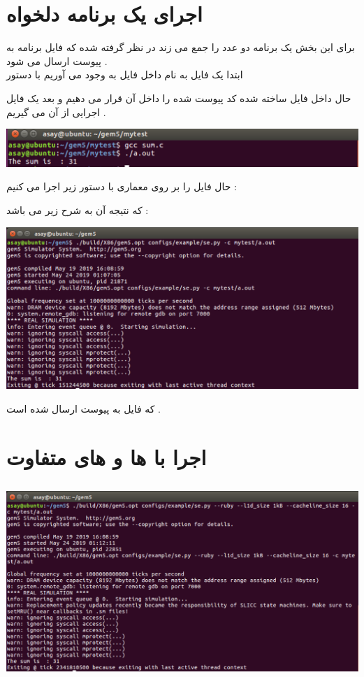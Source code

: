 \documentclass{article}
\begin{document}
\section*{اجرای یک برنامه دلخواه }
برای این بخش یک برنامه دو عدد را جمع می زند در نظر گرفته شده که فایل برنامه به پیوست ارسال می شود  . \\
ابتدا یک فایل به نام 
\textcolor{red}{}
داخل فایل 
به وجود می آوریم با دستور 
\begin{center}
\end{center}
حال داخل فایل ساخته شده کد پیوست شده را داخل آن قرار می دهیم و بعد یک فایل اجرایی از آن می گیریم . 
\begin{center}
	\includegraphics[width=1\textwidth]{sumbuild}
\end{center}
حال فایل 
را بر روی معماری 
با دستور زیر اجرا می کنیم  : 
\begin{center}
\end{center}
که نتیجه آن به شرح زیر می باشد : 
\begin{center}
		\includegraphics[width=1\textwidth]{sumonx86}
\end{center}
که فایل 
به پیوست ارسال شده است  . 
\newpage
\section*{اجرا با 
	ها و 
	های متفاوت }
\subsection*{}
\begin{center}
	\includegraphics[width=1\textwidth]{cacheline16}
\end{center}
\end{document}
